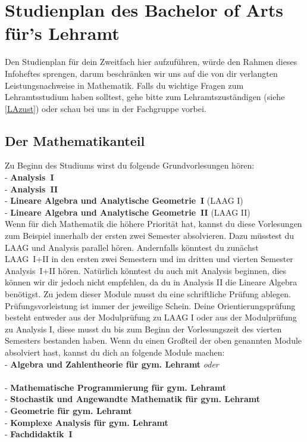 \newpage
\section{Studienplan des Bachelor of Arts für's Lehramt}\label{LA}

Den Studienplan für dein Zweitfach hier aufzuführen,
würde den Rahmen dieses Infoheftes sprengen,
darum beschränken wir uns auf die
von dir verlangten Leistungsnachweise in Mathematik.
Falls du wichtige Fragen zum Lehramtsstudium haben solltest,
gehe bitte zum Lehramtszuständigen (siehe \ref{LAzust})
oder schau bei uns in der Fachgruppe vorbei.

\subsection{Der Mathematikanteil}
Zu Beginn des Studiums wirst du folgende Grundvorlesungen hören:\\[6pt]
- {\bf Analysis~I}\\[2pt]
- {\bf Analysis~II}\\[2pt]
- {\bf Lineare Algebra und Analytische Geometrie~I} (LAAG I)\\[2pt]
- {\bf Lineare Algebra und Analytische Geometrie~II} (LAAG II)\\[6pt]
Wenn für dich Mathematik die höhere Priorität hat,
kannst du diese Vorlesungen zum Beispiel
innerhalb der ersten zwei Semester absolvieren.
Dazu müsstest du LAAG und Analysis parallel hören.
Andernfalls könntest du zunächst LAAG~I+II in den ersten zwei Semestern
und im dritten und vierten Semester Analysis~I+II hören.
Natürlich könntest du auch mit Analysis beginnen,
dies können wir dir jedoch nicht empfehlen,
da du in Analysis II die Lineare Algebra benötigst. 
Zu jedem dieser Module musst du eine schriftliche Prüfung ablegen.
Prüfungsvorleistung ist immer der jeweilige Schein.
Deine Orientierungsprüfung besteht
entweder aus der Modulprüfung zu LAAG I oder aus der Modulprüfung zu Analysis I,
diese musst du bis zum Beginn der Vorlesungszeit
des vierten Semesters bestanden haben. 
Wenn du einen Großteil der oben genannten Module absolviert hast,
kannst du dich an folgende Module machen:\\[6pt]
- {\bf Algebra und Zahlentheorie für gym. Lehramt} {\em oder}\\[2pt]
   \\[2pt]
- {\bf Mathematische Programmierung für gym. Lehramt}\\[2pt]
- {\bf Stochastik und Angewandte Mathematik für gym. Lehramt}\\[2pt]
- {\bf Geometrie für gym. Lehramt}\\[2pt]
- {\bf Komplexe Analysis für gym. Lehramt}\\[2pt]
- {\bf Fachdidaktik~I}\\[6pt]


